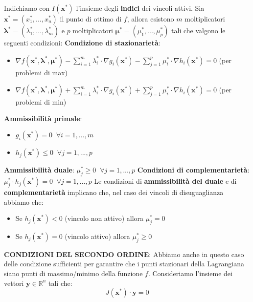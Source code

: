 \documentclass[12pt]{article}
\begin{document}
Indichiamo con $I(\boldsymbol{x}^*)$ l'insieme degli \textbf{indici} dei vincoli attivi.
Sia $\boldsymbol{x}^* = (x_1^*,...,x_n^*)$ il punto di ottimo di $f$, allora esistono $m$ moltiplicatori $\boldsymbol{\lambda}^* = (\lambda_1^*,...,\lambda_m^*)$ e $p$ moltiplicatori 
$\boldsymbol{\mu}^* = (\mu_1^*,...,\mu_p^*)$ tali che valgono le seguenti condizioni: \newline
\newpage
\textbf{Condizione di stazionarietà}:
\begin{itemize}
    \item $\nabla f(\boldsymbol{x}^*, \boldsymbol{\lambda}^*, \boldsymbol{\mu}^*) - \sum_{i=1}^{m}\lambda_i^* \cdot \nabla g_i(\boldsymbol{x}^*) - \sum_{j=1}^{p}\mu_i^* \cdot \nabla h_i(\boldsymbol{x}^*) = 0$ (per problemi di max)
    \item $\nabla f(\boldsymbol{x}^*, \boldsymbol{\lambda}^*, \boldsymbol{\mu}^*) + \sum_{i=1}^{m}\lambda_i^* \cdot \nabla g_i(\boldsymbol{x}^*) + \sum_{j=1}^{p}\mu_i^* \cdot \nabla h_i(\boldsymbol{x}^*) = 0$ (per problemi di min)
\end{itemize}
\textbf{Ammissibilità primale}:
\begin{itemize}
    \item $g_i(\boldsymbol{x}^*) = 0 \; \; \forall i = 1,...,m$
    \item $h_j(\boldsymbol{x}^*) \leq 0 \; \; \forall j = 1,...,p$
\end{itemize}
\textbf{Ammissibilità duale}: $\mu_j^* \geq 0 \; \; \forall j = 1,...,p$ \newline
\textbf{Condizioni di complementarietà}: $\mu_j^* \cdot h_j(\boldsymbol{x}^*) = 0 \; \; \forall j = 1,...,p$ \newline
Le condizioni di \textbf{ammissibilità del duale} e di \textbf{complementarietà} implicano che, nel caso dei vincoli di disuguaglianza abbiamo che:
\begin{itemize}
    \item Se $h_j(\boldsymbol{x}^*) < 0$ (vincolo non attivo) allora $\mu_j^* = 0$
    \item Se $h_j(\boldsymbol{x}^*) = 0$ (vincolo attivo) allora $\mu_j^* \geq 0$
\end{itemize}
\textbf{CONDIZIONI DEL SECONDO ORDINE}: \newline
Abbiamo anche in questo caso delle condizione sufficienti per garantire che i punti stazionari della Lagrangiana siano punti di massimo/minimo della funzione $f$.
Consideriamo l'insieme dei vettori $\boldsymbol{y}\in \mathbb{R}^n$ tali che:
$$J(\boldsymbol{x}^*) \cdot \boldsymbol{y} = 0$$
\end{document}
